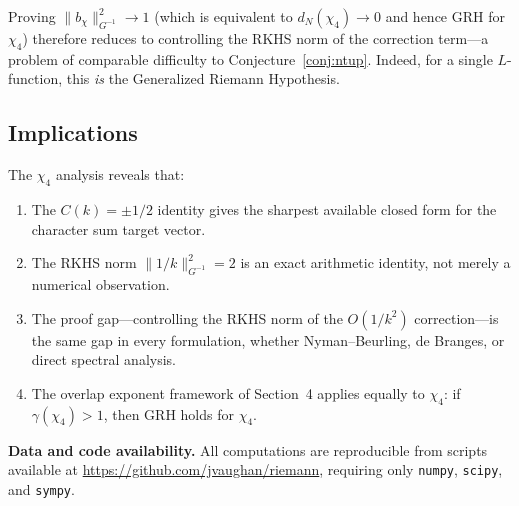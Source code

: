\documentclass[11pt,a4paper]{article}
\begin{document}
Proving $\|b_\chi\|_{G^{-1}}^2 \to 1$ (which is equivalent to $d_N(\chi_4) \to 0$ and hence GRH for $\chi_4$) therefore reduces to controlling the RKHS norm of the correction term---a problem of comparable difficulty to Conjecture~\ref{conj:ntup}. Indeed, for a single $L$-function, this \emph{is} the Generalized Riemann Hypothesis.

\subsection{Implications}

The $\chi_4$ analysis reveals that:
\begin{enumerate}[nosep]
\item The $C(k) = \pm 1/2$ identity gives the sharpest available closed form for the character sum target vector.
\item The RKHS norm $\|1/k\|_{G^{-1}}^2 = 2$ is an exact arithmetic identity, not merely a numerical observation.
\item The proof gap---controlling the RKHS norm of the $O(1/k^2)$ correction---is the same gap in every formulation, whether Nyman--Beurling, de Branges, or direct spectral analysis.
\item The overlap exponent framework of Section~4 applies equally to $\chi_4$: if $\gamma(\chi_4) > 1$, then GRH holds for $\chi_4$.
\end{enumerate}

\bigskip
\noindent\textbf{Data and code availability.} All computations are reproducible from scripts available at \url{https://github.com/jvaughan/riemann}, requiring only \texttt{numpy}, \texttt{scipy}, and \texttt{sympy}.
\end{document}
